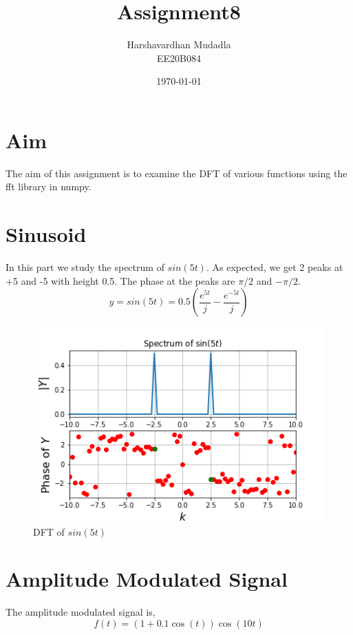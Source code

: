 \documentclass[11pt, a4paper]{article}
\title{Assignment8} %
\author{Harshavardhan Mudadla\\ EE20B084} %
\date{\today} %
\begin{document}
		
		
\maketitle %
\section{Aim}
The aim of this assignment is to examine the DFT of various functions using the fft library in numpy.
\section{Sinusoid}
In this part we study the spectrum of $sin(5t)$. As expected, we get 2 peaks at +5 and -5 with height 0.5. The phase at the peaks are $\pi / 2 $ and $-\pi / 2$.
\begin{equation}
y = sin(5t) = 0.5(\frac{e^{5t}}{j}-\frac{e^{-5t}}{j})
\end{equation}
\begin{figure}[!tbh]
   	\centering
   	\includegraphics[scale=0.8]{fig1.png}  %
   	\caption{DFT of $sin(5t)$}
   	\label{fig:sample}
   \end{figure} 
   
\newpage
\section{Amplitude Modulated Signal}
The amplitude modulated signal is,
\begin{equation}
f(t) = (1+0.1\cos(t))\cos(10t)    
\end{equation}
\end{document}
